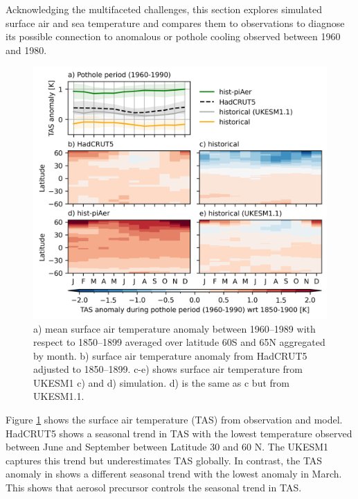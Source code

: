Acknowledging the multifaceted challenges, this section explores simulated surface air and sea temperature and compares them to observations to diagnose its possible connection to anomalous or pothole cooling observed between 1960 and 1980. 


\begin{figure}
    \centering
    \includegraphics{Chapter4/Figs/TAS_anomaly_pothole.png}
    \caption[Surface air anomaly from HadCRUT5, UKESM1 and UKESM1.1 between 1960 and 1989]{a) mean surface air temperature anomaly between 1960--1989 with respect to 1850--1899 averaged over latitude 60\textdegree S and 65\textdegree N aggregated by month. b) surface air temperature anomaly from HadCRUT5 adjusted to 1850--1899. c-e) shows surface air temperature from UKESM1 c) \hist{} and d) \histpiaer{} simulation. d) is the same as c but from UKESM1.1. }
    \label{fig:ch4:seasonal-tas-anomaly-pothole}
\end{figure}

Figure \ref{fig:ch4:seasonal-tas-anomaly-pothole} shows the surface air temperature (TAS) from observation and model. HadCRUT5 shows a seasonal trend in TAS with the lowest temperature observed between June and September between Latitude 30 and 60 \textdegree N. The UKESM1 captures this trend but underestimates TAS globally. In contrast, the TAS anomaly in \histpiaer{} shows a different seasonal trend with the lowest anomaly in March. This shows that aerosol precursor controls the seasonal trend in TAS. 


